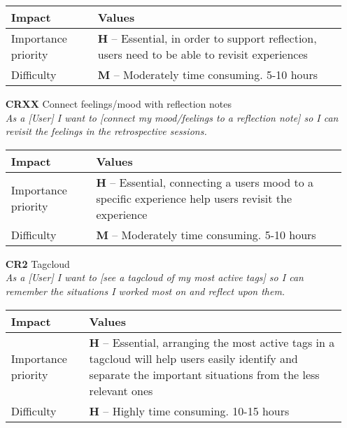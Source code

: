\begin{itemize}
        \begin{tabular}{| l | p{8cm} |}
            \hline
            \rowcolor[gray]{0.8}
            \textbf{Impact} & \textbf{Values} \\
            \hline
            Importance priority & \textbf{H} -- Essential, in order to support reflection, users need to be able to revisit experiences\\
            Difficulty & \textbf{M} -- Moderately time consuming. 5-10 hours\\
            \hline
        \end{tabular}
    \vspace{0.5cm}

    \item[\textbf{CRXX}] Connect feelings/mood with reflection notes\\
        \textit{\small{As a [User] I want to [connect my mood/feelings to a reflection note] so I can revisit the feelings in the retrospective sessions.}}

        \begin{tabular}{| l | p{8cm} |}
            \hline
            \rowcolor[gray]{0.8}
            \textbf{Impact} & \textbf{Values} \\
            \hline
            Importance priority & \textbf{H} -- Essential, connecting a users mood to a specific experience help users revisit the experience\\
            Difficulty & \textbf{M} -- Moderately time consuming. 5-10 hours\\
            \hline
        \end{tabular}
    \vspace{0.5cm}

    \item[\textbf{CR2}] Tagcloud\\
        \textit{\small{As a [User] I want to [see a tagcloud of my most active tags] so I can remember the situations I worked most on and reflect upon them.}}

        \begin{tabular}{| l | p{8cm} |}
            \hline
            \rowcolor[gray]{0.8}
            \textbf{Impact} & \textbf{Values} \\
            \hline
            Importance priority & \textbf{H} -- Essential, arranging the most active tags in a tagcloud will help users easily identify and separate the important situations from the less relevant ones\\
            Difficulty & \textbf{H} -- Highly time consuming. 10-15 hours\\
            \hline
        \end{tabular}
    \vspace{0.5cm}


\end{itemize}
